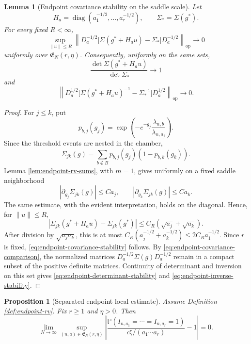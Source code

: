 \documentclass[11pt]{article}
\newtheorem{proposition}[theorem]{Proposition}
\newtheorem{lemma}[theorem]{Lemma}
\theoremstyle{remark}
\newcommand{\Pp}{\mathbb P}
\newcommand{\diag}{\operatorname{diag}}
\begin{document}
\begin{lemma}[Endpoint covariance stability on the saddle scale]
\label{lem:endpoint-covariance-stability}
Let
\[
        H_a=\diag(a_1^{-1/2},\ldots,a_r^{-1/2}),
        \qquad
        \Sigma_*=\Sigma(g^*).
\]
For every fixed \(R<\infty\),
\[
\sup_{\|u\|\le R}
\left\|
D_a^{-1/2}
\bigl[\Sigma(g^*+H_au)-\Sigma_*\bigr]
D_a^{-1/2}
\right\|_{\mathrm{op}}
\longrightarrow0
\tag{8.29}\label{eq:endpoint-covariance-stability}
\]
uniformly over \(\mathfrak E_N(r,\eta)\).  Consequently, uniformly on the
same sets,
\[
        \frac{\det\Sigma(g^*+H_au)}{\det\Sigma_*}\longrightarrow1
\tag{8.30}\label{eq:endpoint-determinant-stability}
\]
and
\[
\left\|
D_a^{1/2}
\bigl[\Sigma(g^*+H_au)^{-1}-\Sigma_*^{-1}\bigr]
D_a^{1/2}
\right\|_{\mathrm{op}}
\longrightarrow0.
\tag{8.31}\label{eq:endpoint-inverse-stability}
\]
\end{lemma}

\begin{proof}
For \(j\le k\), put
\[
        p_{b,j}(g_j)=
        \exp\left(-e^{-g_j}
        \frac{\lambda_{n,b}}{\lambda_{n,a_j}}\right).
\]
Since the threshold events are nested in the chamber,
\[
        \Sigma_{jk}(g)
        =\sum_{b\notin B}p_{b,j}(g_j)(1-p_{b,k}(g_k)).
\tag{8.32}\label{eq:endpoint-covariance-entry}
\]
Lemma \ref{lem:endpoint-rv-sums}, with \(m=1\), gives uniformly on a fixed
saddle neighborhood
\[
        |\partial_{g_j}\Sigma_{jk}(g)|\le Ca_j,
        \qquad
        |\partial_{g_k}\Sigma_{jk}(g)|\le Ca_k.
\tag{8.33}\label{eq:endpoint-covariance-derivatives}
\]
The same estimate, with the evident interpretation, holds on the diagonal.
Hence, for \(\|u\|\le R\),
\[
        |\Sigma_{jk}(g^*+H_au)-\Sigma_{jk}(g^*)|
        \le C_R(\sqrt{a_j}+\sqrt{a_k}).
\]
After division by \(\sqrt{a_ja_k}\), this is at most
\(C_R(a_j^{-1/2}+a_k^{-1/2})\le2C_Ra_1^{-1/2}\).  Since \(r\) is fixed,
\eqref{eq:endpoint-covariance-stability} follows.  By
\eqref{eq:endpoint-covariance-comparison}, the normalized matrices
\(D_a^{-1/2}\Sigma(g)D_a^{-1/2}\) remain in a compact subset of the positive
definite matrices.  Continuity of determinant and inversion on this set gives
\eqref{eq:endpoint-determinant-stability} and
\eqref{eq:endpoint-inverse-stability}.
\end{proof}

\begin{proposition}[Separated endpoint local estimate]
\label{prop:endpoint-rv-joint}
Assume Definition \ref{def:endpoint-rv}.  Fix \(r\ge1\) and \(\eta>0\).
Then
\[
\lim_{N\to\infty}
\sup_{(n,a)\in\mathfrak E_N(r,\eta)}
\left|
\frac{
\Pp(I_{n,a_1}=\cdots=I_{n,a_r}=1)
}{c_\gamma^r/(a_1\cdots a_r)}-1
\right|=0.
\tag{8.34}\label{eq:endpoint-separated-joint}
\]
\end{proposition}
\end{document}
